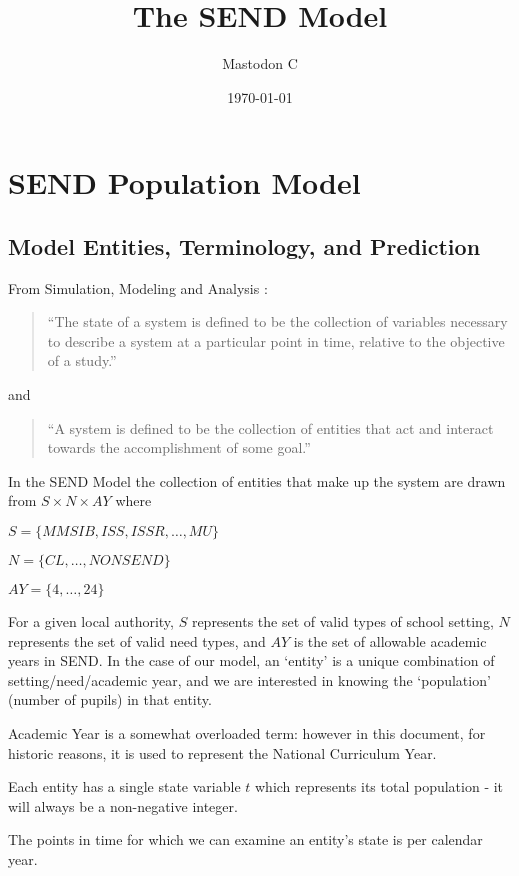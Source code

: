 \documentclass[margin=5mm]{article}
\title{The SEND Model}
\author{
    Mastodon C}
\date{\today}
\begin{document}
\maketitle

\tableofcontents
\section{SEND Population Model}

\subsection{Model Entities, Terminology, and Prediction}\label{summary}
From Simulation, Modeling and Analysis \cite[ch.~1,p.~3]{sma4}:

\begin{quote}
``The state of a system is defined to be the collection of variables
necessary to describe a system at a particular point in time, relative
to the objective of a study.''
\end{quote}

and

\begin{quote}
``A system is defined to be the collection of entities that act and
interact towards the accomplishment of some goal.''
\end{quote}

In the SEND Model the collection of entities that make up the system
are drawn from $S \times N \times AY$ where

$S = \{MMSIB, ISS, ISSR, \dots, MU\}$

$N = \{CL, \dots, NONSEND\}$

$AY = \{4, \dots, 24\}$

For a given local authority, $S$ represents the set of valid types of
school setting, $N$ represents the set of valid need types, and $AY$
is the set of allowable academic years in SEND.  In the case of our
model, an `entity' is a unique combination of setting/need/academic
year, and we are interested in knowing the `population' (number of
pupils) in that entity.

Academic Year is a somewhat overloaded term: however in this document,
for historic reasons, it is used to represent the National Curriculum
Year.

Each entity has a single state variable $t$ which represents
its total population - it will always be a non-negative integer.

The points in time for which we can examine an entity's state is per
calendar year.
\end{document}
